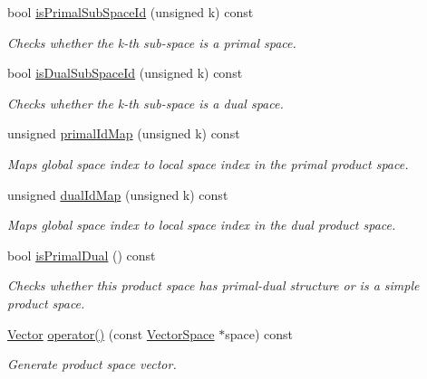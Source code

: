 \begin{DoxyCompactItemize}
bool \hyperlink{classSpacy_1_1ProductSpace_1_1VectorCreator_ae2222235fcde0f0c3b0ae8ca24a7e37e_ae2222235fcde0f0c3b0ae8ca24a7e37e}{is\+Primal\+Sub\+Space\+Id} (unsigned k) const 
\begin{DoxyCompactList}\small\item\em Checks whether the k-\/th sub-\/space is a primal space. \end{DoxyCompactList}\item 
bool \hyperlink{classSpacy_1_1ProductSpace_1_1VectorCreator_a21ce9dcef53ffc64a33153824449df5c_a21ce9dcef53ffc64a33153824449df5c}{is\+Dual\+Sub\+Space\+Id} (unsigned k) const 
\begin{DoxyCompactList}\small\item\em Checks whether the k-\/th sub-\/space is a dual space. \end{DoxyCompactList}\item 
unsigned \hyperlink{classSpacy_1_1ProductSpace_1_1VectorCreator_ad2f0e7c69670de6e11dfaae1e7e1a84c_ad2f0e7c69670de6e11dfaae1e7e1a84c}{primal\+Id\+Map} (unsigned k) const 
\begin{DoxyCompactList}\small\item\em Maps global space index to local space index in the primal product space. \end{DoxyCompactList}\item 
unsigned \hyperlink{classSpacy_1_1ProductSpace_1_1VectorCreator_ace373390f4e15f62c86c684c8bbee4f8_ace373390f4e15f62c86c684c8bbee4f8}{dual\+Id\+Map} (unsigned k) const 
\begin{DoxyCompactList}\small\item\em Maps global space index to local space index in the dual product space. \end{DoxyCompactList}\item 
bool \hyperlink{classSpacy_1_1ProductSpace_1_1VectorCreator_ad42b83acab18ed6a5f7b813403ad8ea5_ad42b83acab18ed6a5f7b813403ad8ea5}{is\+Primal\+Dual} () const 
\begin{DoxyCompactList}\small\item\em Checks whether this product space has primal-\/dual structure or is a simple product space. \end{DoxyCompactList}\item 
\hyperlink{classSpacy_1_1ProductSpace_1_1Vector}{Vector} \hyperlink{classSpacy_1_1ProductSpace_1_1VectorCreator_a733adf12a3b60abc8b93b8a1476c5e8a_a733adf12a3b60abc8b93b8a1476c5e8a}{operator()} (const \hyperlink{classSpacy_1_1VectorSpace}{Vector\+Space} $\ast$space) const 
\begin{DoxyCompactList}\small\item\em Generate product space vector. \end{DoxyCompactList}\end{DoxyCompactItemize}


